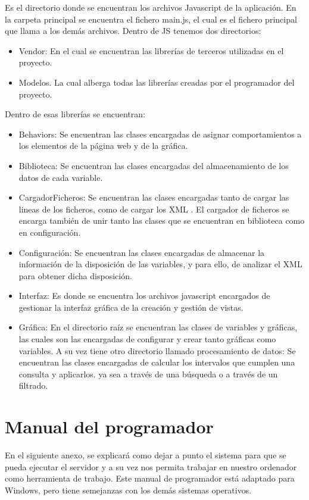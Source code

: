 Es el directorio donde se encuentran los archivos Javascript de la aplicación. En la carpeta principal se encuentra el fichero main.js, el cual es el fichero principal que llama a los demás archivos.
Dentro de JS tenemos dos directorios:
\begin{itemize}
	\item Vendor: En el cual se encuentran las librerías de terceros utilizadas en el proyecto.

	\item Modelos. La cual alberga todas las librerías creadas por el programador del proyecto.

\end{itemize}
Dentro de esas librerías se encuentran:
\begin{itemize}
	\item Behaviors: Se encuentran las clases encargadas de asignar comportamientos a los elementos de la página web y de la gráfica.

	\item Biblioteca:
Se encuentran las clases encargadas del almacenamiento de los datos de cada variable.
	\item CargadorFicheros: Se encuentran las clases encargadas tanto de cargar las lineas de los ficheros, como de cargar los XML \cite{XML}. El cargador de ficheros se encarga también de unir tanto las clases que se encuentran en biblioteca como en configuración. 

	\item Configuración: Se encuentran las clases encargadas de almacenar la información de la disposición de las variables, y para ello, de analizar el XML para obtener dicha disposición.
	
	\item Interfaz: Es donde se encuentra los archivos javascript encargados de gestionar la interfaz gráfica de la creación y gestión de vistas.

	\item Gráfica: En el directorio raíz se encuentran las clases de variables y gráficas, las cuales son las encargadas de configurar y crear tanto gráficas como variables. A su vez tiene otro directorio llamado procesamiento de datos: Se encuentran las clases encargadas de calcular los intervalos que cumplen una consulta y aplicarlos. ya sea a través de una búsqueda o a través de un filtrado.

\end{itemize}



\section{Manual del programador}
En el siguiente anexo, se explicará como dejar a punto el sistema para que se pueda ejecutar el servidor y a su vez nos permita trabajar en nuestro ordenador como herramienta de trabajo. Este manual de programador está adaptado para Windows, pero tiene semejanzas con los demás sistemas operativos.

